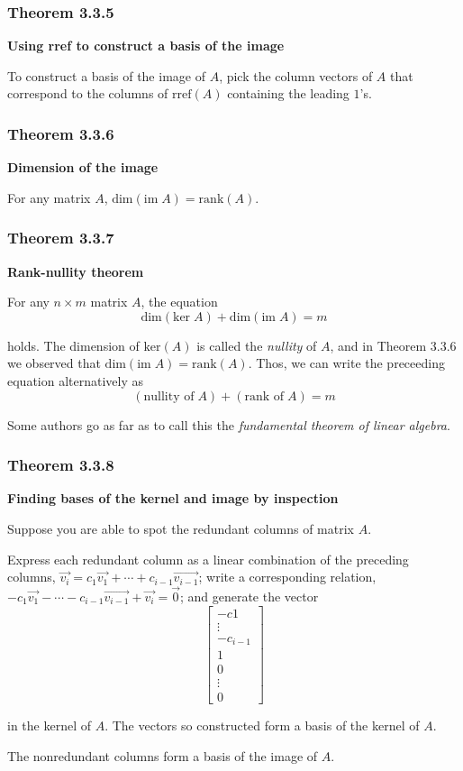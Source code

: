 \documentclass{report}
\begin{document}
\subsubsection*{Theorem 3.3.5}
\par\noindent\textbf{Using rref to construct a basis of the image}
\par\noindent To construct a basis of the image of $A$, pick the column vectors of $A$ that correspond to the columns of $\textrm{rref}(A)$ containing the leading $1$'s.
\subsubsection*{Theorem 3.3.6}
\par\noindent\textbf{Dimension of the image}
\par\noindent For any matrix $A$, $\textrm{dim}(\textrm{im}\;{}A)=\textrm{rank}(A)$.
\subsubsection*{Theorem 3.3.7}
\par\noindent\textbf{Rank-nullity theorem}
\par\noindent For any $n\times{}m$ matrix $A$, the equation
\[\textrm{dim}(\textrm{ker}\;{}A)+\textrm{dim}(\textrm{im}\;{}A)=m\]
\par\noindent holds. The dimension of $\textrm{ker}(A)$ is called the \textit{nullity} of $A$, and in Theorem 3.3.6 we observed that $\textrm{dim}(\textrm{im}\;{}A)=\textrm{rank}(A)$. Thos, we can write the preceeding equation alternatively as
\[(\textrm{nullity of}\;{}A)+(\textrm{rank of}\;{}A)=m\]
\par\noindent Some authors go as far as to call this the \textit{fundamental theorem of linear algebra}.
\subsubsection*{Theorem 3.3.8}
\par\noindent\textbf{Finding bases of the kernel and image by inspection}
\par\noindent Suppose you are able to spot the redundant columns of matrix $A$.
\par\noindent Express each redundant column as a linear combination of the preceding columns, $\vec{v_{i}}=c_{1}\vec{v_{1}}+\cdots{}+c_{i-1}\vec{v_{i-1}}$; write a corresponding relation, $-c_{1}\vec{v_{1}}-\cdots{}-c_{i-1}\vec{v_{i-1}}+\vec{v_{i}}=\vec{0}$; and generate the vector
\[\left[\begin{array}{c}-c{1}\\ \vdots{} \\ -c_{i-1} \\ 1 \\ 0 \\ \vdots{} \\ 0\end{array}\right]\]
\par\noindent in the kernel of $A$. The vectors so constructed form a basis of the kernel of $A$.
\par\noindent The nonredundant columns form a basis of the image of $A$.
\end{document}
